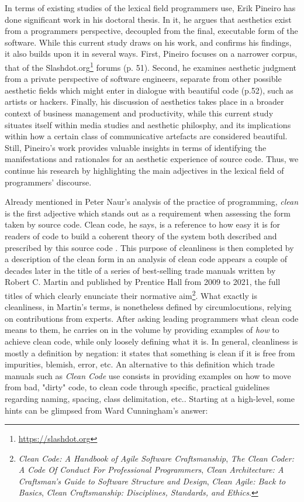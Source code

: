 In terms of existing studies of the lexical field programmers use, Erik Pineiro has done significant work in his doctoral thesis. In it, he argues that aesthetics exist from a programmers perspective, decoupled from the final, executable form of the software. While this current study draws on his work, and confirms his findings, it also builds upon it in several ways. First, Pineiro focuses on a narrower corpus, that of the Slashdot.org\footnote{\url{https://slashdot.org}} forums \citep{pineiro_aesthetics_2003} (p. 51). Second, he examines aesthetic judgment from a private perspective of software engineers, separate from other possible aesthetic fields which might enter in dialogue with beautiful code \citep{pineiro_aesthetics_2003} (p.52), such as artists or hackers. Finally, his discussion of aesthetics takes place in a broader context of business management and productivity, while this current study situates itself within media studies and aesthetic philosphy, and its implications within how a certain class of communicative artefacts are considered beautiful. Still, Pineiro's work provides valuable insights in terms of identifying the manifestations and rationales for an aesthetic experience of source code. Thus, we continue his research by highlighting the main adjectives in the lexical field of programmers' discourse.

\vspace{1\baselineskip}

Already mentioned in Peter Naur's analysis of the practice of programming, \emph{clean} is the first adjective which stands out as a requirement when assessing the form taken by source code. Clean code, he says, is a reference to how easy it is for readers of code to build a coherent theory of the system both described and prescribed by this source code \citep{naur_programming_1985}. This purpose of cleanliness is then completed by a description of the clean form in an analysis of clean code appears a couple of decades later in the title of a series of best-selling trade manuals written by Robert C. Martin and published by Prentice Hall from 2009 to 2021, the full titles of which clearly enunciate their normative aim\footnote{\emph{Clean Code: A Handbook of Agile Software Craftsmanship}, \emph{The Clean Coder: A Code Of Conduct For Professional Programmers}, \emph{Clean Architecture: A Craftsman's Guide to Software Structure and Design}, \emph{Clean Agile: Back to Basics}, \emph{Clean Craftsmanship: Disciplines, Standards, and Ethics}.}. What exactly is cleanliness, in Martin's terms, is nonetheless defined by circumlocutions, relying on contributions from experts. After asking leading programmers what clean code means to them, he carries on in the volume by providing examples of \emph{how} to achieve clean code, while only loosely defining what it is. In general, cleanliness is mostly a definition by negation: it states that something is clean if it is free from impurities, blemish, error, etc. An alternative to this definition which trade manuals such as \emph{Clean Code} use consists in providing examples on how to move from bad, "dirty" code, to clean code through specific, practical guidelines regarding naming, spacing, class delimitation, etc.. Starting at a high-level, some hints can be glimpsed from Ward Cunningham's answer:

